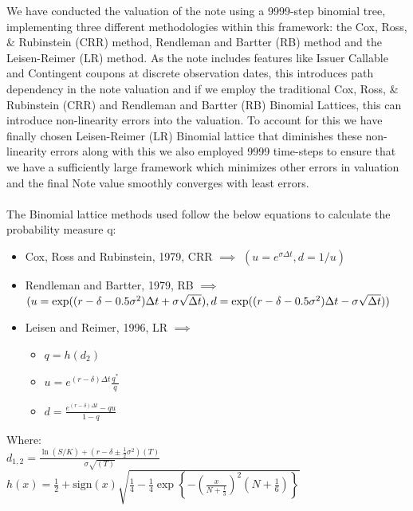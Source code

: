 \documentclass[12pt,a4paper]{article}
\begin{document}
We have conducted the valuation of the note using a 9999-step binomial tree, implementing three different methodologies within this framework: the Cox, Ross, \& Rubinstein (CRR) method, Rendleman and Bartter (RB) method and the Leisen-Reimer (LR) method. As the note includes features like Issuer Callable and Contingent coupons at discrete observation dates, this introduces path dependency in the note valuation and if we employ the traditional Cox, Ross, \& Rubinstein (CRR) and Rendleman and Bartter (RB) Binomial Lattices, this can introduce non-linearity errors into the valuation. To account for this we have finally chosen Leisen-Reimer (LR) Binomial lattice that diminishes these non-linearity errors along with this we also employed 9999 time-steps to ensure that we have a sufficiently large framework which minimizes other errors in valuation and the final Note value smoothly converges with least errors.\\\\
The Binomial lattice methods used follow the below equations to calculate the probability measure q:
\begin{itemize}
    \item Cox, Ross and Rubinstein, 1979, CRR $\implies$ $(u = e^{\sigma\Delta t}, d = 1/u)$
    
    \item Rendleman and Bartter, 1979, RB $\implies$ $(u = \exp((r - \delta - 0.5\sigma^2)\Delta t + \sigma\sqrt{\Delta t}), \\ d = \exp((r - \delta - 0.5\sigma^2)\Delta t - \sigma\sqrt{\Delta t}))$
    
    \item Leisen and Reimer, 1996, LR $\implies$
    \begin{itemize}
        \item $q = h(d_2)$
        \item $u = e^{(r-\delta)\Delta t}\frac{q^*}{q}$
        \item $d = \frac{e^{(r-\delta)\Delta t} - qu}{1-q}$
    \end{itemize}
\end{itemize}

Where:\\[0.5cm]
$d_{1,2} = \frac{\ln(S/K) + (r - \delta \pm \frac{1}{2}\sigma^2)(T)}{\sigma\sqrt{(T)}}$ \\

$h(x) = \frac{1}{2} + \text{sign}(x)\sqrt{\frac{1}{4} - \frac{1}{4}\exp\left\{-\left(\frac{x}{N+\frac{1}{3}}\right)^2\left(N+\frac{1}{6}\right)\right\}}$ \\
\end{document}
